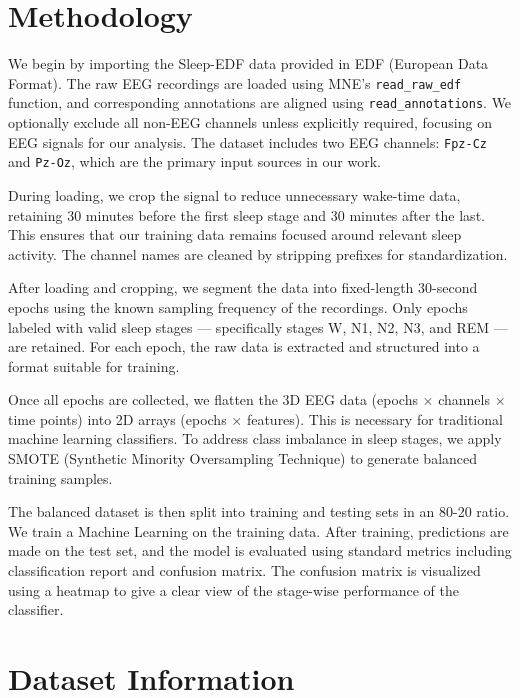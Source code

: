 
\section{Methodology}

We begin by importing the Sleep-EDF data provided in EDF (European Data Format). The raw EEG recordings are loaded using MNE's \texttt{read\_raw\_edf} function, and corresponding annotations are aligned using \texttt{read\_annotations}. We optionally exclude all non-EEG channels unless explicitly required, focusing on EEG signals for our analysis. The dataset includes two EEG channels: \texttt{Fpz-Cz} and \texttt{Pz-Oz}, which are the primary input sources in our work.

During loading, we crop the signal to reduce unnecessary wake-time data, retaining 30 minutes before the first sleep stage and 30 minutes after the last. This ensures that our training data remains focused around relevant sleep activity. The channel names are cleaned by stripping prefixes for standardization.

After loading and cropping, we segment the data into fixed-length 30-second epochs using the known sampling frequency of the recordings. Only epochs labeled with valid sleep stages — specifically stages W, N1, N2, N3, and REM — are retained. For each epoch, the raw data is extracted and structured into a format suitable for training.

Once all epochs are collected, we flatten the 3D EEG data (epochs $\times$ channels $\times$ time points) into 2D arrays (epochs $\times$ features). This is necessary for traditional machine learning classifiers. To address class imbalance in sleep stages, we apply SMOTE (Synthetic Minority Oversampling Technique) to generate balanced training samples.


 


The balanced dataset is then split into training and testing sets in an 80-20 ratio. We train a  Machine Learning   on the training data. After training, predictions are made on the test set, and the model is evaluated using standard metrics including classification report and confusion matrix. The confusion matrix is visualized using a heatmap to give a clear view of the stage-wise performance of the classifier.


\section{Dataset Information}

